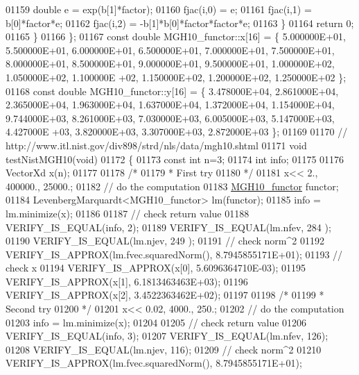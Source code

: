 \begin{DoxyCode}
01159             \textcolor{keywordtype}{double} e = exp(b[1]*factor);
01160             fjac(i,0) = e;
01161             fjac(i,1) = b[0]*factor*e;
01162             fjac(i,2) = -b[1]*b[0]*factor*factor*e;
01163         \}
01164         \textcolor{keywordflow}{return} 0;
01165     \}
01166 \};
01167 \textcolor{keyword}{const} \textcolor{keywordtype}{double} MGH10\_functor::x[16] = \{ 5.000000E+01, 5.500000E+01, 6.000000E+01, 6.500000E+01, 7.000000E+01,
       7.500000E+01, 8.000000E+01, 8.500000E+01, 9.000000E+01, 9.500000E+01, 1.000000E+02, 1.050000E+02, 1.100000E
      +02, 1.150000E+02, 1.200000E+02, 1.250000E+02 \};
01168 \textcolor{keyword}{const} \textcolor{keywordtype}{double} MGH10\_functor::y[16] = \{ 3.478000E+04, 2.861000E+04, 2.365000E+04, 1.963000E+04, 1.637000E+04,
       1.372000E+04, 1.154000E+04, 9.744000E+03, 8.261000E+03, 7.030000E+03, 6.005000E+03, 5.147000E+03, 4.427000E
      +03, 3.820000E+03, 3.307000E+03, 2.872000E+03 \};
01169 
01170 \textcolor{comment}{// http://www.itl.nist.gov/div898/strd/nls/data/mgh10.shtml}
01171 \textcolor{keywordtype}{void} testNistMGH10(\textcolor{keywordtype}{void})
01172 \{
01173   \textcolor{keyword}{const} \textcolor{keywordtype}{int} n=3;
01174   \textcolor{keywordtype}{int} info;
01175 
01176   VectorXd x(n);
01177 
01178   \textcolor{comment}{/*}
01179 \textcolor{comment}{   * First try}
01180 \textcolor{comment}{   */}
01181   x<< 2., 400000., 25000.;
01182   \textcolor{comment}{// do the computation}
01183   \hyperlink{struct_m_g_h10__functor}{MGH10\_functor} functor;
01184   LevenbergMarquardt<MGH10\_functor> lm(functor);
01185   info = lm.minimize(x);
01186 
01187   \textcolor{comment}{// check return value}
01188   VERIFY\_IS\_EQUAL(info, 2); 
01189   VERIFY\_IS\_EQUAL(lm.nfev, 284 ); 
01190   VERIFY\_IS\_EQUAL(lm.njev, 249 ); 
01191   \textcolor{comment}{// check norm^2}
01192   VERIFY\_IS\_APPROX(lm.fvec.squaredNorm(), 8.7945855171E+01);
01193   \textcolor{comment}{// check x}
01194   VERIFY\_IS\_APPROX(x[0], 5.6096364710E-03);
01195   VERIFY\_IS\_APPROX(x[1], 6.1813463463E+03);
01196   VERIFY\_IS\_APPROX(x[2], 3.4522363462E+02);
01197 
01198   \textcolor{comment}{/*}
01199 \textcolor{comment}{   * Second try}
01200 \textcolor{comment}{   */}
01201   x<< 0.02, 4000., 250.;
01202   \textcolor{comment}{// do the computation}
01203   info = lm.minimize(x);
01204 
01205   \textcolor{comment}{// check return value}
01206   VERIFY\_IS\_EQUAL(info, 3);
01207   VERIFY\_IS\_EQUAL(lm.nfev, 126);
01208   VERIFY\_IS\_EQUAL(lm.njev, 116);
01209   \textcolor{comment}{// check norm^2}
01210   VERIFY\_IS\_APPROX(lm.fvec.squaredNorm(), 8.7945855171E+01);

\end{DoxyCode}
